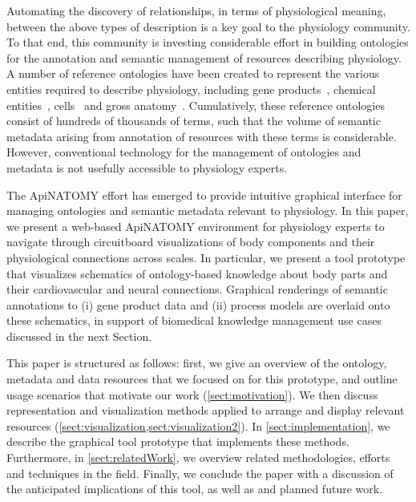 Automating the discovery of relationships, in terms of physiological meaning, between the above types of description is a key goal to the physiology community. To that end, this community is investing considerable effort in building ontologies for the annotation and semantic management of resources describing physiology. A number of reference ontologies have been created to represent the various entities required to describe physiology, including gene products~\cite{Bla+13}, chemical entities~\cite{HMD+13}, cells~\cite{BRA05} and gross anatomy~\cite{RM03}. Cumulatively, these reference ontologies consist of hundreds of thousands of terms, such that the volume of semantic metadata arising from annotation of resources with these terms is considerable. However, conventional technology for the management of ontologies and metadata is not usefully accessible to physiology experts.

The ApiNATOMY effort has emerged to provide intuitive graphical interface for managing ontologies and semantic metadata relevant to physiology. In this paper, we present a web-based ApiNATOMY environment for physiology experts to navigate through circuitboard visualizations of body components and their physiological connections across scales. In particular, we present a tool prototype that visualizes schematics of ontology-based knowledge about body parts and their cardiovascular and neural connections. Graphical renderings of semantic annotations to (i) gene product data and (ii) process models are overlaid onto these schematics, in support of biomedical knowledge management use cases discussed in the next Section.

This paper is structured as follows: first, we give an overview of the ontology, metadata and data resources that we focused on for this prototype, and outline usage scenarios that motivate our work (\cref{sect:motivation}).  We then discuss representation and visualization methods applied to arrange and display relevant resources (\cref{sect:visualization,sect:visualization2}). In \cref{sect:implementation}, we describe the graphical tool prototype that implements these methods. Furthermore, in \cref{sect:relatedWork}, we overview related methodologies, efforts and techniques in the field. Finally, we conclude the paper with a discussion of the anticipated implications of this tool, as well as and planned future work.
